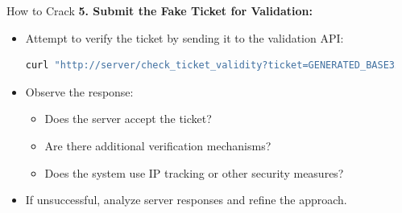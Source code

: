 \documentclass[final,dvipsnames]{beamer}
\newlength{\sepwidth}
\newlength{\colwidth}
\newcommand{\separatorcolumn}{\begin{column}{\sepwidth}\end{column}}
\begin{document}
\begin{frame}[t, fragile]
\begin{columns}[t]
\begin{column}{\colwidth}
\begin{block}{How to Crack}
        \textbf{5. Submit the Fake Ticket for Validation:}
        \begin{itemize}
            \item Attempt to verify the ticket by sending it to the validation API:
            \begin{lstlisting}[language=bash]
            curl "http://server/check_ticket_validity?ticket=GENERATED_BASE32_TICKET"
            \end{lstlisting}
            \item Observe the response:
            \begin{itemize}
                \item Does the server accept the ticket?
                \item Are there additional verification mechanisms?
                \item Does the system use IP tracking or other security measures?
            \end{itemize}
            \item If unsuccessful, analyze server responses and refine the approach.
        \end{itemize}

    \end{block}

\end{column}




\separatorcolumn
\end{columns}
\end{frame}
\end{document}
